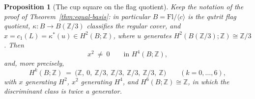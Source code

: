 \documentclass[11pt,a4paper]{article}
\newtheorem{proposition}[theorem]{Proposition}
\begin{document}
\begin{proposition}[The cup square on the flag quotient]
\label{prop:cupsquare}
Keep the notation of the proof of Theorem~\ref{thm:equal-basis}: in
particular $B=\mathrm{Fl}/\langle c\rangle$ is the qutrit flag quotient,
$\kappa\colon B\to B(\mathbb Z/3)$ classifies the regular cover, and
$x=c_1(L)=\kappa^*(u)\in H^2(B;\mathbb Z)$, where $u$ generates
$H^2(B(\mathbb Z/3);\mathbb Z)\cong\mathbb Z/3$. Then
\[
x^2\ \ne\ 0\qquad\text{in }H^4(B;\mathbb Z),
\]
and, more precisely,
\[
H^k(B;\mathbb Z)\ =\ \bigl(\mathbb Z,\ 0,\ \mathbb Z/3,\ \mathbb Z/3,\
\mathbb Z/3,\ \mathbb Z/3,\ \mathbb Z\bigr)\qquad(k=0,\dots,6),
\]
with $x$ generating $H^2$, $x^2$ generating $H^4$, and
$H^6(B;\mathbb Z)\cong\mathbb Z$, in which the discriminant class is twice a
generator.
\end{proposition}
\end{document}
